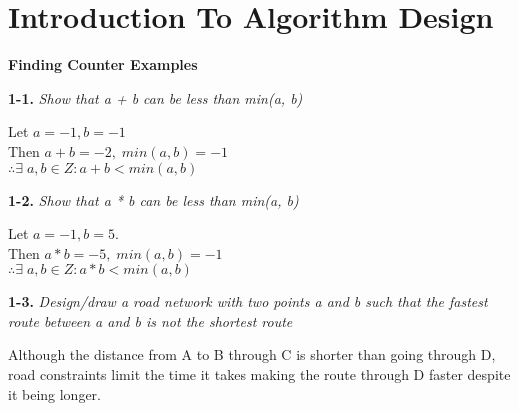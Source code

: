 \section{Introduction To Algorithm Design}

\textbf{Finding Counter Examples}

\textbf{1-1.} \emph{Show that a + b can be less than min(a, b)}
  \begin{center}
  Let $a = -1, b = -1$ \\ 
  Then $a + b = -2, \; min(a,b) = -1$ \\
  $\therefore \exists \; a, b \in Z : a+b < min(a,b)$
  \end{center}
  

\textbf{1-2.} \emph{Show that a * b can be less than min(a, b)}
  \begin{center}
  Let $a = -1, b = 5$. \\
  Then $a*b = -5, \; min(a,b) = -1$\\
  $\therefore \exists \; a, b \in Z : a*b < min(a,b)$
  \end{center}

\textbf{1-3.} \emph{Design/draw a road network with two points a and b such that the fastest route between a and b is not the shortest route}
	\begin{center}
	\end{center}
Although the distance from A to B through C is shorter than going through D, road constraints limit the time it takes making the route through D faster despite it being longer.


